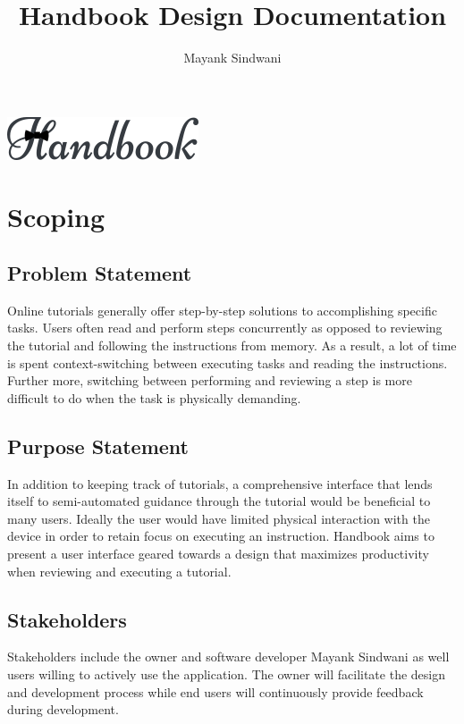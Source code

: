 \documentclass[12pt]{article}
\title{Handbook Design Documentation}
\author{Mayank Sindwani}
\begin{document}
\begin{titlepage}
    \centering
    \maketitle
    \includegraphics[scale=0.2]{images/logo.png}
    \tableofcontents
\end{titlepage}

\section{Scoping}

\subsection{Problem Statement}

Online tutorials generally offer step-by-step solutions to accomplishing specific tasks. Users often read and perform steps concurrently as opposed to reviewing the tutorial and following the instructions from memory. As a result, a lot of time is spent context-switching between executing tasks and reading the instructions. Further more, switching between performing and reviewing a step is more difficult to do when the task is physically demanding.


\subsection{Purpose Statement}

In addition to keeping track of tutorials, a comprehensive interface that lends itself to semi-automated guidance through the tutorial would be beneficial to many users. Ideally the user would have limited physical interaction with the device in order to retain focus on executing an instruction. Handbook aims to present a user interface geared towards a design that maximizes productivity when reviewing and executing a tutorial.  

\subsection{Stakeholders}

Stakeholders include the owner and software developer Mayank Sindwani as well users willing to actively use the application. The owner will facilitate the design and development process while end users will continuously provide feedback during development.
\end{document}
